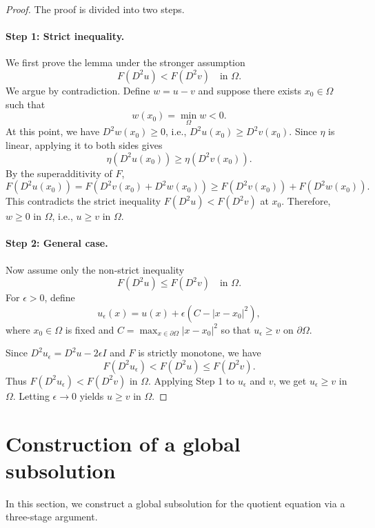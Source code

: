 \documentclass[reqno,a4paper]{amsart}
\numberwithin{equation}{section}
\begin{document}
	\begin{proof}
		The proof is divided into two steps.
		
		\paragraph{Step 1: Strict inequality.}
		We first prove the lemma under the stronger assumption
		\[
		F(D^2 u) < F(D^2 v) \quad \text{in } \Omega.
		\]
		We argue by contradiction. Define $w = u - v$ and suppose there exists $x_0 \in \Omega$ such that
		\[
		w(x_0) = \min_{\Omega} w < 0.
		\]
		At this point, we have $D^2 w(x_0) \ge 0$, i.e., $D^2 u(x_0) \ge D^2 v(x_0)$.
		Since $\eta$ is linear, applying it to both sides gives
		\[
		\eta(D^2 u(x_0)) \ge \eta(D^2 v(x_0)).
		\]
		By the superadditivity of $F$,
		\[
		F(D^2u(x_0)) = F(D^2v(x_0) + D^2w(x_0)) \ge F(D^2v(x_0)) + F(D^2w(x_0)).
		\]
		This contradicts the strict inequality $F(D^2 u) < F(D^2 v)$ at $x_0$. Therefore, $w \ge 0$ in $\Omega$, i.e., $u \ge v$ in $\Omega$.
		
		\paragraph{Step 2: General case.}
		Now assume only the non-strict inequality
		\[
		F(D^2 u) \le F(D^2 v) \quad \text{in } \Omega.
		\]
		For $\epsilon > 0$, define
		\[
		u_\epsilon(x) = u(x) + \epsilon (C - |x - x_0|^2),
		\]
		where $x_0 \in \Omega$ is fixed and $C = \max_{x \in \partial \Omega} |x - x_0|^2$ so that $u_\epsilon \ge v$ on $\partial \Omega$.
		
		Since $D^2 u_\epsilon = D^2 u - 2\epsilon I$ and $F$ is strictly monotone, we have
		\[
		F(D^2 u_\epsilon) < F(D^2 u) \le F(D^2 v).
		\]
		Thus $F(D^2 u_\epsilon) < F(D^2 v)$ in $\Omega$. Applying Step 1 to $u_\epsilon$ and $v$, we get $u_\epsilon \ge v$ in $\Omega$. Letting $\epsilon \to 0$ yields $u \ge v$ in $\Omega$.
	\end{proof}
	
	\section{Construction of a global subsolution}
	
	In this section, we construct a global subsolution for the quotient equation via a three-stage argument.
	
	
	
\end{document}
